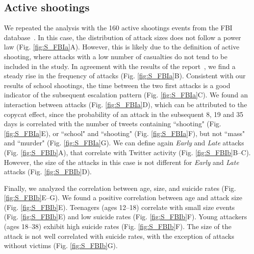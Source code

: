 \subsection*{Active shootings}
We repeated the analysis with the 160 active shootings events from the FBI database~\cite{FBI}. 
In this case, the distribution of attack sizes does not follow a power law (Fig. \ref{fig:S_FBIa}A). However, this is likely due to the definition of active shooting, where attacks with a low number of casualties do not tend to be included in the study. In agreement with the results of the report~\cite{FBI}, we find a steady rise in the frequency of attacks (Fig. \ref{fig:S_FBIa}B). 
Consistent with our results of school shootings, the time between the two first attacks is a good indicator of the subsequent escalation pattern (Fig. \ref{fig:S_FBIa}C). 
We found an interaction between attacks (Fig. \ref{fig:S_FBIa}D), which can be attributed to the copycat effect, since the probability of an attack in the subsequent 8, 19 and 35 days is correlated with the number of tweets containing ``shooting" (Fig. \ref{fig:S_FBIa}E), or ``school" and ``shooting" (Fig. \ref{fig:S_FBIa}F), but not ``mass" and ``murder" (Fig. \ref{fig:S_FBIa}G). 
We can define again \textit{Early} and \textit{Late} attacks (Fig. \ref{fig:S_FBIb}A), that correlate with Twitter activity (Fig. \ref{fig:S_FBIb}B--C). 
However, the size of the attacks in this case is not different for \textit{Early} and \textit{Late} attacks (Fig. \ref{fig:S_FBIb}D). 

Finally, we analyzed the correlation between age, size, and suicide rates (Fig. \ref{fig:S_FBIb}E--G). We found a positive correlation between age and attack size (Fig. \ref{fig:S_FBIb}E). 
Teenagers (ages 12--18) correlate with small size events (Fig. \ref{fig:S_FBIb}E) and low suicide rates (Fig. \ref{fig:S_FBIb}F). Young attackers (ages 18--38) exhibit high suicide rates (Fig. \ref{fig:S_FBIb}F). The size of the attack is not well correlated with suicide rates, with the exception of attacks without victims (Fig. \ref{fig:S_FBIb}G). 
